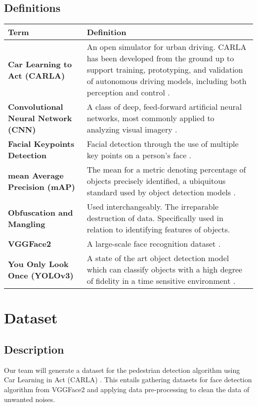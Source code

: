 \subsection{Definitions}

\begin{center}
  \begin{tabular}{ | l | p{10cm} | } 
    \hline \textbf{Term} & \textbf{Definition} \\ \hline
    \textbf{Car Learning to Act (CARLA)} & An open simulator for urban driving. CARLA has been developed from the ground up to support training, prototyping, and validation of autonomous driving models, including both perception and control \cite{Carla}. \\ \hline 
    \textbf{Convolutional Neural Network (CNN)} & A class of deep, feed-forward artificial neural networks, most commonly applied to analyzing visual imagery \cite{CNN2}. \\ \hline
    \textbf{Facial Keypoints Detection} & Facial detection through the use of multiple key points on a person’s face \cite{VGGFace2}. \\ \hline
    \textbf{mean Average Precision (mAP)} & The mean for a metric denoting percentage of objects precisely identified, a ubiquitous standard used by object detection models \cite{YOLOv3}. \\ \hline
    \textbf{Obfuscation and Mangling} & Used interchangeably. The irreparable destruction of data. Specifically used in relation to identifying features of objects. \\ \hline
    \textbf{VGGFace2} & A large-scale face recognition dataset \cite{VGGFace2}. \\ \hline
    \textbf{You Only Look Once (YOLOv3)} & A state of the art object detection model which can classify objects with a high degree of fidelity in a time sensitive environment \cite{YOLOv3}. \\ \hline
  \end{tabular}
\end{center}

\section{Dataset}

\subsection{Description}

Our team will generate a dataset for the pedestrian detection algorithm using Car Learning in Act (CARLA) \cite{Carla}. This entails gathering datasets for face detection algorithm from VGGFace2 \cite{VGGFace2} and applying data pre-processing to clean the data of unwanted noises.

